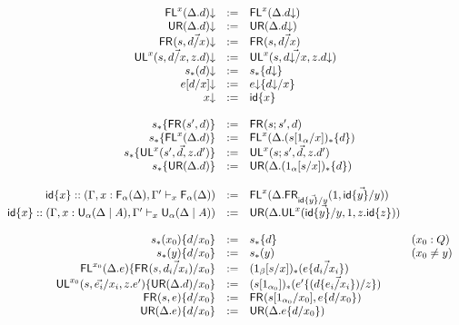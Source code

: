 \begin{figure}
\begin{small}
\[
\begin{array}{rcll}
\mathsf{FL}^{x}(\Delta.d)\mathord{\downarrow} & := & \mathsf{FL}^{x}(\Delta.d\mathord{\downarrow})\\
\mathsf{UR}(\Delta.d)\mathord{\downarrow} & := & \mathsf{UR}(\Delta.d\mathord{\downarrow})\\
\mathsf{FR}_{}(s,\vec{d/x})\mathord{\downarrow} & := & \mathsf{FR}_{}(s,\vec{d/x})\\
\mathsf{UL}^{x}_{}(s,\vec{d/x},z.d)\mathord{\downarrow} & := & {\mathsf{UL}^{x}_{}(s,\vec{d\mathord{\downarrow}/x},z.d\mathord{\downarrow})}\\
s_*(d)\mathord{\downarrow} & := & s_*\{d\mathord{\downarrow}\}\\
e[d/x]\mathord{\downarrow} & := & e\mathord{\downarrow}\{d\mathord{\downarrow}/x\}\\
{x}\mathord{\downarrow} & := & {\mathsf{id}\{x\}}\\
\\
s_*\{\mathsf{FR}_{}(s',d)\} & := & \mathsf{FR}_{}(s;s',d)\\
s_*\{\mathsf{FL}^{x}(\Delta.d)\} & := & \mathsf{FL}^{x}(\Delta.(s[1_\alpha/x])_*\{d\})\\
s_*\{\mathsf{UL}^{x}_{}(s',\vec{d},z.d')\} & := & {\mathsf{UL}^{x}_{}(s;s',\vec{d},z.d')}\\
s_*\{\mathsf{UR}(\Delta.d)\} & := & \mathsf{UR}(\Delta.(1_\alpha[s/x])_*\{d\}) \\
\\
{\mathsf{id}\{x\}} :: (\Gamma,x:\mathsf{F}_{\alpha}(\Delta),\Gamma' \vdash_{x} \mathsf{F}_{\alpha}(\Delta)) & := & \mathsf{FL}^{x}(\Delta.\mathsf{FR}_{\vec{{\mathsf{id}\{y\}}/y}}(1,\vec{{\mathsf{id}\{y\}}/y}))\\
{\mathsf{id}\{x\}} :: (\Gamma,x:\mathsf{U}_{\alpha}(\Delta \mid A),\Gamma' \vdash_{x} \mathsf{U}_{\alpha}(\Delta \mid A)) & := & \mathsf{UR}(\Delta.\mathsf{UL}^{x}_{}(\vec{{\mathsf{id}\{y\}}/y},1,z.{\mathsf{id}\{z\}})) \\
\\
s_*(x_0)\{d/x_0\} & := & s_*\{d\} & (x_0 : Q)\\
s_*(y)\{d/x_0\} & := & s_*(y) & (x_0 \neq y)\\
\mathsf{FL}^{x_0}(\Delta.e)\{\mathsf{FR}_{}(s,\vec{d_i/x_i})/x_0\} & := & (1_\beta[s/x])_*(e\{\vec{d_i/x_i}\}) \\
\mathsf{UL}^{x_0}_{}(s,\vec{e_i}/x_i,z.e')\{\mathsf{UR}(\Delta.d)/x_0\} & := & (s[1_{\alpha_0}])_*(e'\{(d\{{\vec{e_i/x_i}}\})/z\}) &  \\
\mathsf{FR}_{}(s,e)\{d/x_0\} & := & {\mathsf{FR}_{}(s[1_{\alpha_0}/x_0],e\{d/x_0\})}\\
\mathsf{UR}(\Delta.e)\{d/x_0\} & := & \mathsf{UR}(\Delta.e\{d/x_0\})\\

\end{array}\]
\end{small}
\end{figure}
